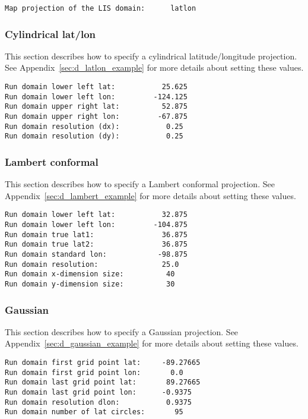  \begin{Verbatim}[frame=single]
Map projection of the LIS domain:      latlon
 \end{Verbatim}

 
 \subsubsection{Cylindrical lat/lon} \label{sssec:run_latlon}
 This section describes how to specify a cylindrical latitude/longitude
 projection.
 See Appendix~\ref{sec:d_latlon_example} for more details about
 setting these values.
 

 \begin{Verbatim}[frame=single]
Run domain lower left lat:           25.625
Run domain lower left lon:         -124.125
Run domain upper right lat:          52.875
Run domain upper right lon:         -67.875
Run domain resolution (dx):           0.25
Run domain resolution (dy):           0.25
 \end{Verbatim}

 
 \subsubsection{Lambert conformal} \label{sssec:run_lambert}
 This section describes how to specify a Lambert conformal
 projection.
 See Appendix~\ref{sec:d_lambert_example} for more details about
 setting these values.
 

 \begin{Verbatim}[frame=single]
Run domain lower left lat:           32.875
Run domain lower left lon:         -104.875
Run domain true lat1:                36.875
Run domain true lat2:                36.875
Run domain standard lon:            -98.875
Run domain resolution:               25.0
Run domain x-dimension size:          40
Run domain y-dimension size:          30
 \end{Verbatim}

 
 \subsubsection{Gaussian} \label{sssec:run_gaussian}
 This section describes how to specify a Gaussian
 projection.
 See Appendix~\ref{sec:d_gaussian_example} for more details about
 setting these values.
 

 \begin{Verbatim}[frame=single]
Run domain first grid point lat:     -89.27665
Run domain first grid point lon:       0.0
Run domain last grid point lat:       89.27665
Run domain last grid point lon:      -0.9375
Run domain resolution dlon:           0.9375
Run domain number of lat circles:       95
 \end{Verbatim}

